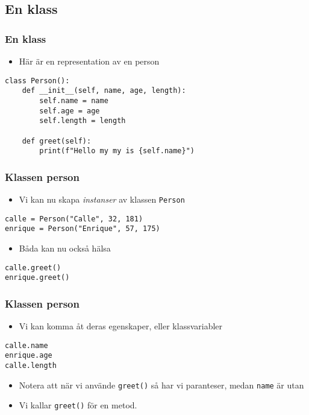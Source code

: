\documentclass[aspectratio=169]{beamer}
\begin{document}
\subsection{En klass}

\begin{frame}[fragile]
	\frametitle{En klass}
	
	\begin{itemize}
		\item Här är en representation av en person
	\end{itemize}
	
	\begin{lstlisting}
class Person():
    def __init__(self, name, age, length):
        self.name = name
        self.age = age
        self.length = length
        
    def greet(self):
        print(f"Hello my my is {self.name}")
	\end{lstlisting}
	
\end{frame}

\begin{frame}[fragile]
	\frametitle{Klassen person}
	
	\begin{itemize}
		\item Vi kan nu skapa \textit{instanser} av klassen \texttt{Person}
	\end{itemize}
	
	\begin{lstlisting}
calle = Person("Calle", 32, 181)
enrique = Person("Enrique", 57, 175)
	\end{lstlisting}
	
	\begin{itemize}
		\item Båda kan nu också hälsa
	\end{itemize}
	
	\begin{lstlisting}
calle.greet()
enrique.greet()
	\end{lstlisting}
	
\end{frame}

\begin{frame}[fragile]
	\frametitle{Klassen person}
	
	\begin{itemize}
		\item Vi kan komma åt deras egenskaper, eller klassvariabler
	\end{itemize}
	
	\begin{lstlisting}
calle.name
enrique.age
calle.length
	\end{lstlisting}
	
	\begin{itemize}
		\item Notera att när vi använde \texttt{greet()} så har vi paranteser, medan \texttt{name} är utan
		\item Vi kallar \texttt{greet()} för en metod.
	\end{itemize}
	
\end{frame}
\end{document}
